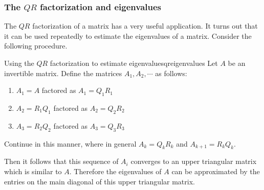 \subsubsection{The $QR$ factorization and eigenvalues}

The $QR$ factorization of a matrix has a very useful application. It turns out that it can be used repeatedly to estimate the eigenvalues of a matrix. Consider the following procedure.

\begin{procedure}{Using the $QR$ factorization to estimate eigenvalues}{qreigenvalues}
Let $A$ be an invertible matrix. Define the matrices $A_1, A_2, \cdots$ as follows:
\begin{enumerate}
\item 
$A_1 = A$ factored as $A_1 = Q_1R_1$
\item 
$A_2 = R_1Q_1$ factored as $A_2 = Q_2R_2$
\item 
$A_3 = R_2Q_2$ factored as $A_3 = Q_3R_3$
\end{enumerate}

Continue in this manner, where in general $A_k = Q_kR_k$ and $A_{k+1} = R_kQ_k$. 

Then it follows that this sequence of $A_i$ converges to an upper triangular matrix which is similar to $A$. Therefore the eigenvalues of $A$ can be approximated by the entries on the main diagonal of this upper triangular matrix. 
\end{procedure}